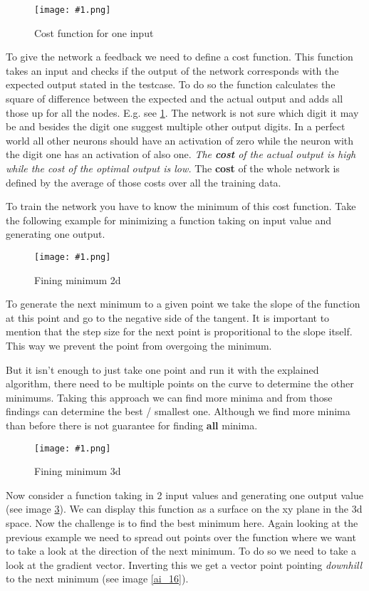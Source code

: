 \documentclass{article}
\newcommand{\lbl}[1]{(see image \ref{#1})}
\newcommand{\img}[1]{
	\centering
	\texttt{[image: \#1.png]}
	\label{#1}
}
\begin{document}
\begin{figure}[!htbp]
\img{ai_13}
\caption{Cost function for one input}
\end{figure}

To give the network a feedback we need to define a cost function. This function takes an input and checks if the output of the network corresponds with the expected output stated in the testcase. To do so the function calculates the square of difference between the expected and the actual output and adds all those up for all the nodes. E.g. see \ref{ai_13}. The network is not sure which digit it may be and besides the digit one suggest multiple other output digits. In a perfect world all other neurons should have an activation of zero while the neuron with the digit one has an activation of also one. \textit{The \textbf{cost} of the actual output is high while the cost of the optimal output is low.} The \textbf{cost} of the whole network is defined by the average of those costs over all the training data.


To train the network you have to know the minimum of this cost function. Take the following example for minimizing a function taking on input value and generating one output. 

\begin{figure}[!htbp]
\img{ai_14}
\caption{Fining minimum 2d}
\end{figure}

To generate the next minimum to a given point we take the slope of the function at this point and go to the negative side of the tangent. It is important to mention that the step size for the next point is proporitional to the slope itself. This way we prevent the point from overgoing the minimum. 

But it isn't enough to just take one point and run it with the explained algorithm, there need to be multiple points on the curve to determine the other minimums. Taking this approach we can find more minima and from those findings can determine the best / smallest one. Although we find more minima than before there is not guarantee for finding \textbf{all} minima.

\begin{figure}[!htbp]
\img{ai_14}
\caption{Fining minimum 3d}
\end{figure}

Now consider a function taking in 2 input values and generating one output value \lbl{ai_14}. We can display this function as a surface on the xy plane in the 3d space. Now the challenge is to find the best minimum here. Again looking at the previous example we need to spread out points over the function where we want to take a look at the direction of the next minimum. To do so we need to take a look at the gradient vector. Inverting this we get a vector point pointing \textit{downhill} to the next minimum \lbl{ai_16}. 
\end{document}
